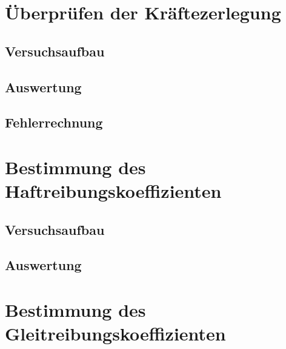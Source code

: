 \documentclass{article}
\begin{document}
\section{Überprüfen der Kräftezerlegung}
\subsection{Versuchsaufbau}
\begin{figure}
    \centering
    \qquad
    \caption{}
    \label{fig:example}%
\end{figure}
\subsection{Auswertung}
\subsection{Fehlerrechnung}
\section{Bestimmung des Haftreibungskoeffizienten}
\subsection{Versuchsaufbau}
\subsection{Auswertung}
\section{Bestimmung des Gleitreibungskoeffizienten}
\end{document}
